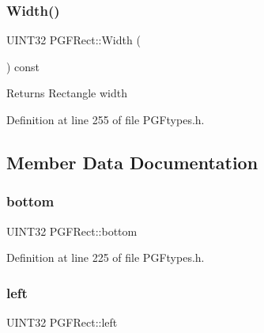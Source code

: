 \subsubsection{\texorpdfstring{Width()}{Width()}}
{\footnotesize\ttfamily U\+I\+N\+T32 P\+G\+F\+Rect\+::\+Width (\begin{DoxyParamCaption}{ }\end{DoxyParamCaption}) const\hspace{0.3cm}{\ttfamily [inline]}}

\begin{DoxyReturn}{Returns}
Rectangle width 
\end{DoxyReturn}


Definition at line 255 of file P\+G\+Ftypes.\+h.


\begin{DoxyCode}{0}

\end{DoxyCode}


\subsection{Member Data Documentation}
\mbox{\label{structPGFRect_a7dc57925fee73fb4b3a1e3744971f579}} 
\subsubsection{\texorpdfstring{bottom}{bottom}}
{\footnotesize\ttfamily U\+I\+N\+T32 P\+G\+F\+Rect\+::bottom}



Definition at line 225 of file P\+G\+Ftypes.\+h.

\mbox{\label{structPGFRect_ac3472e1dc20bc4b1584058376fd7b989}} 
\subsubsection{\texorpdfstring{left}{left}}
{\footnotesize\ttfamily U\+I\+N\+T32 P\+G\+F\+Rect\+::left}



